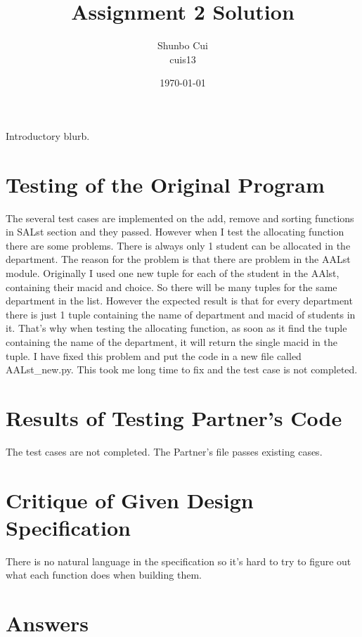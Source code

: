 \documentclass[12pt]{article}
\title{Assignment 2 Solution}
\author{Shunbo Cui\\cuis13}
\date{\today}
\begin{document}
\maketitle

Introductory blurb.

\section{Testing of the Original Program}

The several test cases are implemented on the add, remove and sorting functions in SALst section and they passed. However when I test the allocating function there are some problems. There is always only 1 student can be allocated in the department. The reason for the problem is that there are problem in the AALst module. Originally I used one new tuple for each of the student in the AAlst, containing their macid and choice. So there will be many tuples for the same department in the list. However the expected result is that for every department there is just 1 tuple containing the name of department and macid of students in it. That's why when testing the allocating function, as soon as it find the tuple containing the name of the department, it will return the single macid in the tuple. I have fixed this problem and put the code in a new file called AALst\_new.py. This took me long time to fix and the test case is not completed.

\section{Results of Testing Partner's Code}

The test cases are not completed. The Partner's file passes existing cases.

\section{Critique of Given Design Specification}

There is no natural language in the specification so it's hard to try to figure out what each function does when building them.
\section{Answers}
\end{document}
